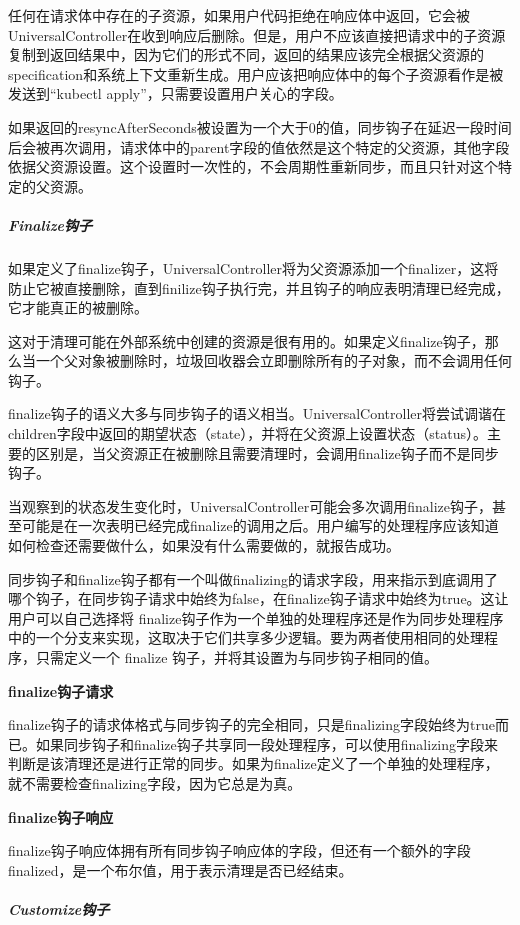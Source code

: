 \documentclass[macfonts,master]{njuthesis}
\begin{document}
任何在请求体中存在的子资源，如果用户代码拒绝在响应体中返回，它会被UniversalController在收到响应后删除。但是，用户不应该直接把请求中的子资源复制到返回结果中，因为它们的形式不同，返回的结果应该完全根据父资源的specification和系统上下文重新生成。用户应该把响应体中的每个子资源看作是被发送到“kubectl apply”，只需要设置用户关心的字段。

如果返回的resyncAfterSeconds被设置为一个大于0的值，同步钩子在延迟一段时间后会被再次调用，请求体中的parent字段的值依然是这个特定的父资源，其他字段依据父资源设置。这个设置时一次性的，不会周期性重新同步，而且只针对这个特定的父资源。

\subparagraph{Finalize钩子}
如果定义了finalize钩子，UniversalController将为父资源添加一个finalizer，这将防止它被直接删除，直到finilize钩子执行完，并且钩子的响应表明清理已经完成，它才能真正的被删除。

这对于清理可能在外部系统中创建的资源是很有用的。如果定义finalize钩子，那么当一个父对象被删除时，垃圾回收器会立即删除所有的子对象，而不会调用任何钩子。

finalize钩子的语义大多与同步钩子的语义相当。UniversalController将尝试调谐在children字段中返回的期望状态（state），并将在父资源上设置状态（status）。主要的区别是，当父资源正在被删除且需要清理时，会调用finalize钩子而不是同步钩子。

当观察到的状态发生变化时，UniversalController可能会多次调用finalize钩子，甚至可能是在一次表明已经完成finalize的调用之后。用户编写的处理程序应该知道如何检查还需要做什么，如果没有什么需要做的，就报告成功。

同步钩子和finalize钩子都有一个叫做finalizing的请求字段，用来指示到底调用了哪个钩子，在同步钩子请求中始终为false，在finalize钩子请求中始终为true。这让用户可以自己选择将 finalize钩子作为一个单独的处理程序还是作为同步处理程序中的一个分支来实现，这取决于它们共享多少逻辑。要为两者使用相同的处理程序，只需定义一个 finalize 钩子，并将其设置为与同步钩子相同的值。

\textbf{finalize钩子请求}

finalize钩子的请求体格式与同步钩子的完全相同，只是finalizing字段始终为true而已。如果同步钩子和finalize钩子共享同一段处理程序，可以使用finalizing字段来判断是该清理还是进行正常的同步。如果为finalize定义了一个单独的处理程序，就不需要检查finalizing字段，因为它总是为真。

\textbf{finalize钩子响应}

finalize钩子响应体拥有所有同步钩子响应体的字段，但还有一个额外的字段finalized，是一个布尔值，用于表示清理是否已经结束。

\subparagraph{Customize钩子}
\end{document}
